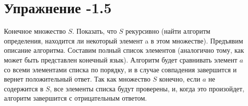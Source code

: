 \documentclass[12pt, a4paper, oneside]{memoir}
\begin{document}
\section*{Упражнение -1.5}
\begin{solution}
    {Конечное множество $S$.}
    {Показать, что $S$ рекурсивно (найти алгоритм определения, находится ли некоторый элемент a в этом множестве).}
    {Предъявим описание алгоритма.}
    Составим полный список элементов (аналогично тому, как может быть представлен конечный язык). Алгоритм будет сравнивать элемент $a$ со всеми элементами списка по порядку, и в случае совпадения завершится и вернет положительный ответ. Так как множество $S$ конечно, если $a$ не содержится в $S$, все элементы списка будут проверены, и, когда это произойдет, алгоритм завершится с отрицательным ответом.

\end{solution}
\end{document}
